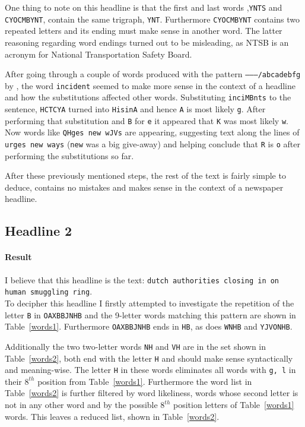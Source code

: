 \documentclass[12pt,a4paper,onecolumn]{article}
\begin{document}
One thing to note on this headline is that the first and last words ,\texttt{YNTS} and \texttt{CYOCMBYNT}, contain the same trigraph, \texttt{YNT}. Furthermore \texttt{CYOCMBYNT} contains two repeated letters and its ending must make sense in another word. The latter reasoning regarding word endings turned out to be misleading, as NTSB is an acronym for National Transportation Safety Board. 

After going through a couple of words produced with the pattern \texttt{---------/abcadebfg} by \citep{tool:design215}, the word \texttt{incident} seemed to make more sense in the context of a headline and how the substitutions affected other words. Substituting \texttt{inciMBnts} to the sentence, \texttt{HCTCYA} turned into \texttt{HisinA} and hence \texttt{A} is most likely \texttt{g}. After performing that substitution and \texttt{B} for \texttt{e} it appeared that \texttt{K} was most likely \texttt{w}. Now words like \texttt{QHges new wJVs} are appearing, suggesting text along the lines of \texttt{urges new ways} (\texttt{new} was a big give-away) and helping conclude that \texttt{R} is \texttt{o} after performing the substitutions so far.

After these previously mentioned steps, the rest of the text is fairly simple to deduce, contains no mistakes and makes sense in the context of a newspaper headline.

\subsection{Headline 2}
\paragraph{Result} I believe that this headline is the text: \texttt{dutch authorities closing in on human smuggling ring}.\\

To decipher this headline I firstly attempted to investigate the repetition of the letter \texttt{B} in \texttt{OAXBBJNHB} and the 9-letter words matching this pattern are shown in Table~\ref{words1}. Furthermore \texttt{OAXBBJNHB} ends in \texttt{HB}, as does \texttt{WNHB} and \texttt{YJVONHB}.

Additionally the two two-letter words \texttt{NH}
and \texttt{VH} are in the set shown in Table~\ref{words2}, both end with the letter \texttt{H} and should make sense syntactically and meaning-wise. The letter \texttt{H} in these words eliminates all words with \texttt{g, l} in their $8^{th}$ position from Table~\ref{words1}. Furthermore the word list in Table~\ref{words2} is further filtered by word likeliness, words whose second letter is not in any other word and by the possible $8^{th}$ position letters of Table~\ref{words1} words. This leaves a reduced list, shown in Table~\ref{words2}.
\end{document}
